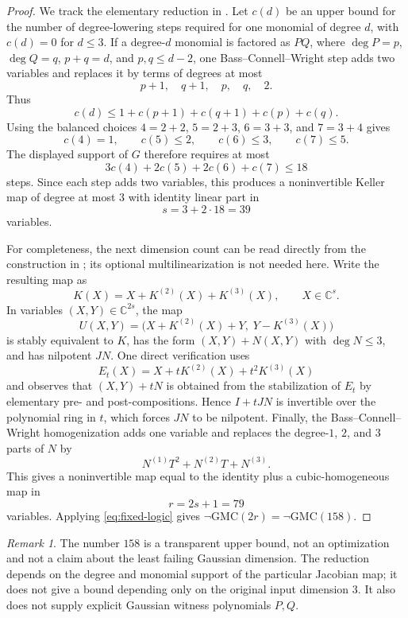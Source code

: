 \documentclass[11pt]{article}
\newcommand{\C}{\mathbb C}
\newcommand{\GMC}{\mathrm{GMC}}
\theoremstyle{remark}
\newtheorem{remark}[theorem]{Remark}
\begin{document}
\begin{proof}
We track the elementary reduction in \cite[Section~3]{BCW}.  Let $c(d)$ be an upper bound for the number of degree-lowering steps required for one monomial of degree $d$, with $c(d)=0$ for $d\leq3$.  If a degree-$d$ monomial is factored as $PQ$, where $\deg P=p$, $\deg Q=q$, $p+q=d$, and $p,q\leq d-2$, one Bass--Connell--Wright step adds two variables and replaces it by terms of degrees at most
\[
  p+1,\quad q+1,\quad p,\quad q,\quad 2.
\]
Thus
\[
  c(d)\leq1+c(p+1)+c(q+1)+c(p)+c(q).
\]
Using the balanced choices $4=2+2$, $5=2+3$, $6=3+3$, and $7=3+4$ gives
\[
  c(4)=1,\qquad c(5)\leq2,\qquad c(6)\leq3,
  \qquad c(7)\leq5.
\]
The displayed support of $G$ therefore requires at most
\[
  3c(4)+2c(5)+2c(6)+c(7)\leq18
\]
steps.  Since each step adds two variables, this produces a noninvertible Keller map of degree at most $3$ with identity linear part in
\[
  s=3+2\cdot18=39
\]
variables.

For completeness, the next dimension count can be read directly from the construction in \cite[Section~4]{BCW}; its optional multilinearization is not needed here.  Write the resulting map as
\[
  K(X)=X+K^{(2)}(X)+K^{(3)}(X),\qquad X\in\C^s.
\]
In variables $(X,Y)\in\C^{2s}$, the map
\[
  U(X,Y)=\bigl(X+K^{(2)}(X)+Y,\;Y-K^{(3)}(X)\bigr)
\]
is stably equivalent to $K$, has the form $(X,Y)+N(X,Y)$ with $\deg N\leq3$, and has nilpotent $JN$.  One direct verification uses
\[
 E_t(X)=X+tK^{(2)}(X)+t^2K^{(3)}(X)
\]
and observes that $(X,Y)+tN$ is obtained from the stabilization of $E_t$ by elementary pre- and post-compositions.  Hence $I+tJN$ is invertible over the polynomial ring in $t$, which forces $JN$ to be nilpotent.  Finally, the Bass--Connell--Wright homogenization adds one variable and replaces the degree-$1$, $2$, and $3$ parts of $N$ by
\[
  N^{(1)}T^2+N^{(2)}T+N^{(3)}.
\]
This gives a noninvertible map equal to the identity plus a cubic-homogeneous map in
\[
  r=2s+1=79
\]
variables.  Applying \eqref{eq:fixed-logic} gives $\neg\GMC(2r)=\neg\GMC(158)$.
\end{proof}

\begin{remark}
The number $158$ is a transparent upper bound, not an optimization and not a claim about the least failing Gaussian dimension.  The reduction depends on the degree and monomial support of the particular Jacobian map; it does not give a bound depending only on the original input dimension $3$.  It also does not supply explicit Gaussian witness polynomials $P,Q$.
\end{remark}
\end{document}

